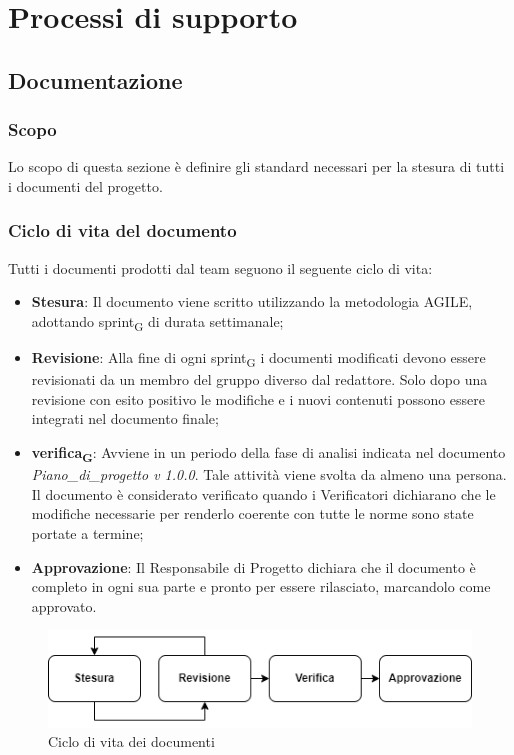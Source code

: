 \section{Processi di supporto}

\subsection{Documentazione}

\subsubsection{Scopo}
Lo scopo di questa sezione è definire gli standard necessari per la stesura di tutti i documenti del progetto.

\subsubsection{Ciclo di vita del documento}
Tutti i documenti prodotti dal team seguono il seguente ciclo di vita:
\begin{itemize}
    \item \textbf{Stesura}: Il documento viene scritto utilizzando la metodologia AGILE, adottando sprint\textsubscript{G} di durata settimanale;
    \item \textbf{Revisione}: Alla fine di ogni sprint\textsubscript{G} i documenti modificati devono essere revisionati da un membro del gruppo diverso dal redattore. Solo dopo una revisione con esito positivo le modifiche e i nuovi contenuti possono essere integrati nel documento finale;
    \item \textbf{verifica\textsubscript{G}}: Avviene in un periodo della fase di analisi indicata nel documento \textit{Piano\_di\_progetto v 1.0.0}. Tale attività viene svolta da almeno una persona. Il documento è considerato verificato quando i Verificatori dichiarano che le modifiche necessarie per renderlo coerente con tutte le norme sono state portate a termine;
    \item \textbf{Approvazione}: Il Responsabile di Progetto dichiara che il documento è completo in ogni sua parte e pronto per essere rilasciato, marcandolo come approvato.
\end{itemize}
\begin{figure}[H]
    \centering
    \includegraphics[scale=0.8]{img/ciclo_di_vita.png}
    \caption{Ciclo di vita dei documenti}
\end{figure}

